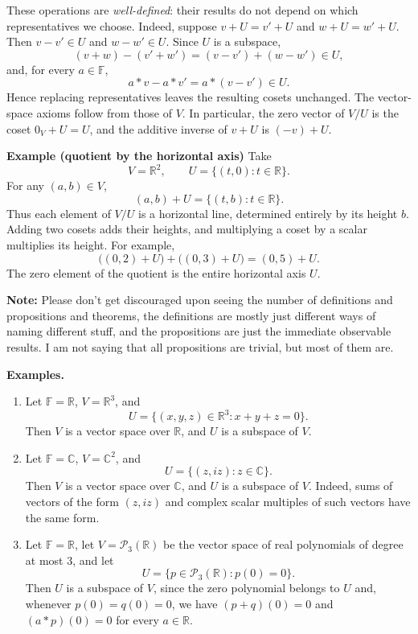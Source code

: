 \documentclass[a4paper,11pt,abstract=true]{scrartcl}
\theoremstyle{dotlessP}
\theoremstyle{dotlessS}
\theoremstyle{remark}
\theoremstyle{definition}
\begin{document}
These operations are \emph{well-defined}: their results do not depend on
which representatives we choose. Indeed, suppose $v+U=v'+U$ and
$w+U=w'+U$. Then $v-v'\in U$ and $w-w'\in U$. Since $U$ is a subspace,
\[
(v+w)-(v'+w')=(v-v')+(w-w')\in U,
\]
and, for every $a\in\mathbb{F}$,
\[
a*v-a*v'=a*(v-v')\in U.
\]
Hence replacing representatives leaves the resulting cosets unchanged.
The vector-space axioms follow from those of $V$. In particular, the zero
vector of $V/U$ is the coset $0_V+U=U$, and the additive inverse of $v+U$
is $(-v)+U$.

\begin{example_box}
\textbf{Example (quotient by the horizontal axis)} Take
\[
V=\mathbb{R}^2,
\qquad U=\{(t,0):t\in\mathbb{R}\}.
\]
For any $(a,b)\in V$,
\[
(a,b)+U=\{(t,b):t\in\mathbb{R}\}.
\]
Thus each element of $V/U$ is a horizontal line, determined entirely by its
height $b$. Adding two cosets adds their heights, and multiplying a coset by
a scalar multiplies its height. For example,
\[
\bigl((0,2)+U\bigr)+\bigl((0,3)+U\bigr)=(0,5)+U.
\]
The zero element of the quotient is the entire horizontal axis $U$.
\end{example_box}

\textbf{Note:} Please don't get discouraged upon seeing the number of definitions and propositions and theorems, the definitions are mostly just different ways of naming different stuff, and the propositions are just the immediate observable results. I am not saying that all propositions are trivial, but most of them are. 

\textbf{Examples.}
\begin{enumerate}
    \item Let $\mathbb{F}=\mathbb{R}$, $V=\mathbb{R}^3$, and
    \[
    U=\{(x,y,z)\in\mathbb{R}^3:x+y+z=0\}.
    \]
    Then $V$ is a vector space over $\mathbb{R}$, and $U$ is a subspace of
    $V$.

    \item Let $\mathbb{F}=\mathbb{C}$, $V=\mathbb{C}^2$, and
    \[
    U=\{(z,iz):z\in\mathbb{C}\}.
    \]
    Then $V$ is a vector space over $\mathbb{C}$, and $U$ is a subspace of
    $V$. Indeed, sums of vectors of the form $(z,iz)$ and complex scalar
    multiples of such vectors have the same form.

    \item Let $\mathbb{F}=\mathbb{R}$, let $V=\mathcal{P}_3(\mathbb{R})$ be the vector
    space of real polynomials of degree at most $3$, and let
    \[
    U=\{p\in\mathcal{P}_3(\mathbb{R}):p(0)=0\}.
    \]
    Then $U$ is a subspace of $V$, since the zero polynomial belongs to $U$
    and, whenever $p(0)=q(0)=0$, we have
    $(p+q)(0)=0$ and $(a*p)(0)=0$ for every $a\in\mathbb{R}$.
\end{enumerate}
\end{document}
